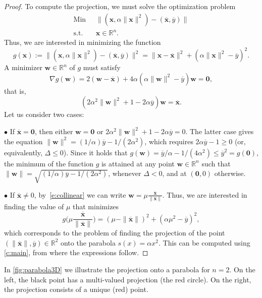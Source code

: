 \documentclass[11pt]{article}
\newcommand{\RR}{\ensuremath{\mathbb R}}
\providecommand{\RR}{\mathbb{R}}
\providecommand{\RR}{\mathbb{R}}
\newcommand{\px}{\overline{x}}
\newcommand{\py}{\overline{y}}
\begin{document}
\begin{proof}
To compute the projection, we must solve the optimization problem
\begin{equation*}
    \begin{aligned}
    \text{Min }\;&\|(\mathbf{x},\alpha \|\mathbf{x}\|^2)-(\mathbf{\px},\py)\|\\
    \text{s.t. }\;&\mathbf{x}\in\RR^n.
\end{aligned}
\end{equation*}
Thus, we are interested in minimizing the function
$$
    g(\textbf{x}):=\|(\mathbf{x},\alpha\|\mathbf{x}\|^2)-(\mathbf{\px},\py)\|^2=\|\mathbf{x}-\mathbf{\px}\|^2+(\alpha\|\mathbf{x}\|^2-\py)^2.
$$
A minimizer $\mathbf{w}\in\RR^n$ of $g$ must satisfy
$$
    \nabla g(\textbf{w})=2(\mathbf{w}-\mathbf{\px})+4\alpha(\alpha\|\mathbf{w}\|^2-\py)\mathbf{w}=\mathbf{0},
$$
that is, 
\begin{equation}\label{e:collinear}
    (2\alpha^2\|\mathbf{w}\|^2+1-2\alpha\py)\mathbf{w}=\mathbf{\px}.
\end{equation} 
Let us consider two cases:

\noindent$\bullet$ If $\mathbf{\px}= \mathbf{0}$, then either $\mathbf{w}=\mathbf{0}$ or $2\alpha^2\|\mathbf{w}\|^2+1-2\alpha\py=0$. The latter case gives the equation $\|\textbf{w}\|^2=(1/\alpha)\py-1/(2\alpha^2)$, which requires $2\alpha\py-1\geq 0$ (or, equivalently, $\Delta\leq 0$). Since it holds that $g(\textbf{w})=\py/\alpha-1/(4\alpha^2)\leq \py^2=g(\mathbf{0})$, the minimum of the function $g$ is attained at any point $\mathbf{w}\in\RR^n$ such that $\|\textbf{w}\|=\sqrt{(1/\alpha)\py-1/(2\alpha^2)}$, whenever $\Delta< 0$, and at $(\mathbf{0},0)$ otherwise.

\noindent$\bullet$ If $\mathbf{\px}\neq 0$, by~\cref{e:collinear} we can write $\mathbf{w}=\mu\frac{\mathbf{\px}}{\|\mathbf{\px}\|}$. Thus, we are interested in finding the value of $\mu$ that minimizes 
$$g\Big(\mu\frac{\mathbf{\px}}{\|\mathbf{\px}\|}\Big)=(\mu-\|\mathbf{\px}\|)^2+(\alpha\mu^2-\py)^2,$$
which corresponds to the problem of finding the projection of the point $(\|\mathbf{\px}\|,\py)\in\RR^2$ onto the parabola $s(x)=\alpha x^2$. This can be computed using \cref{c:main}, from where the expressions follow.
\end{proof}

In \cref{fig:parabola3D} we illustrate the projection onto a parabola for $n=2$. On the left, the black point has a multi-valued projection (the red circle). On the right, the projection consists of a unique (red) point. 
\end{document}
